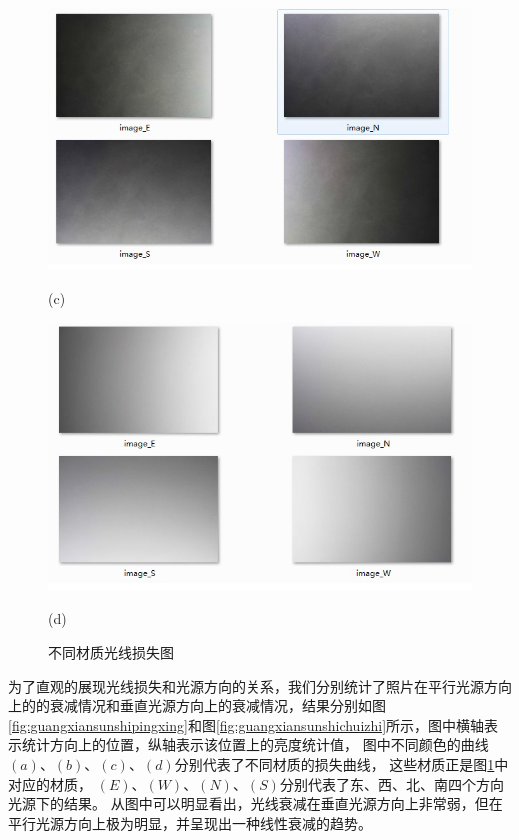 \begin{figure}[htbp]
\begin{minipage}{0.48\linewidth}
\centerline{\includegraphics[width=1\linewidth]{figures/gaungxiansunshic.png}}
\centerline{(c)}
\end{minipage}
\begin{minipage}{0.48\linewidth}
\centerline{\includegraphics[width=1\linewidth]{figures/gaungxiansunshid.png}}
\centerline{(d)}
\end{minipage}

\caption{不同材质光线损失图}
\label{fig:guangxiansunshi}
\vspace{-3mm}
\end{figure}
{}
为了直观的展现光线损失和光源方向的关系，我们分别统计了照片在平行光源方向上的的衰减情况和垂直光源方向上的衰减情况，结果分别如图\ref{fig:guangxiansunshipingxing}和图\ref{fig:guangxiansunshichuizhi}所示，图中横轴表示统计方向上的位置，纵轴表示该位置上的亮度统计值，
图中不同颜色的曲线$(a)$、$(b)$、$(c)$、$(d)$分别代表了不同材质的损失曲线，
这些材质正是图\ref{fig:guangxiansunshi}中对应的材质，
$(E)$、$(W)$、$(N)$、$(S)$分别代表了东、西、北、南四个方向光源下的结果。
从图中可以明显看出，光线衰减在垂直光源方向上非常弱，但在平行光源方向上极为明显，并呈现出一种线性衰减的趋势。

